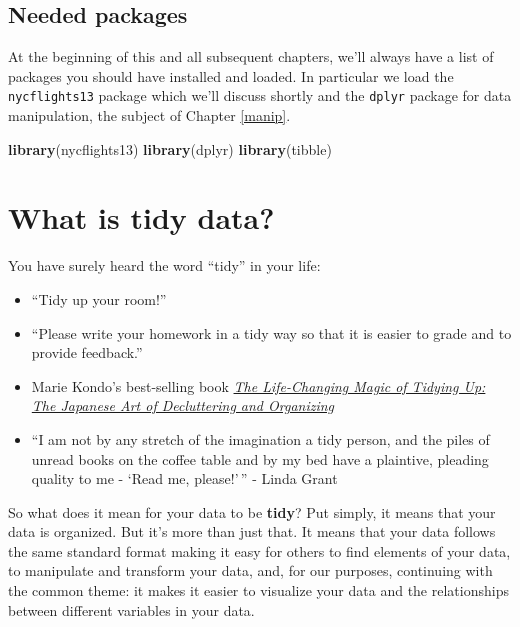 \documentclass[]{tufte-book}
\newenvironment{Shaded}{\begin{snugshade}}{\end{snugshade}}
\newcommand{\KeywordTok}[1]{\textcolor[rgb]{0.13,0.29,0.53}{\textbf{{#1}}}}
\newcommand{\NormalTok}[1]{{#1}}
\providecommand{\tightlist}{%
  \setlength{\itemsep}{0pt}\setlength{\parskip}{0pt}}
\begin{document}
\subsection*{Needed packages}\label{needed-packages}

At the beginning of this and all subsequent chapters, we'll always have
a list of packages you should have installed and loaded. In particular
we load the \texttt{nycflights13} package which we'll discuss shortly
and the \texttt{dplyr} package for data manipulation, the subject of
Chapter \ref{manip}.

\begin{Shaded}
\begin{Highlighting}[]
\KeywordTok{library}\NormalTok{(nycflights13)}
\KeywordTok{library}\NormalTok{(dplyr)}
\KeywordTok{library}\NormalTok{(tibble)}
\end{Highlighting}
\end{Shaded}

\section{What is tidy data?}\label{what-is-tidy-data}

You have surely heard the word ``tidy'' in your life:

\begin{itemize}
\tightlist
\item
  ``Tidy up your room!''
\item
  ``Please write your homework in a tidy way so that it is easier to
  grade and to provide feedback.''
\item
  Marie Kondo's best-selling book
  \href{https://www.amazon.com/Life-Changing-Magic-Tidying-Decluttering-Organizing/dp/1607747308/ref=sr_1_1?ie=UTF8\&qid=1469400636\&sr=8-1\&keywords=tidying+up}{\emph{The
  Life-Changing Magic of Tidying Up: The Japanese Art of Decluttering
  and Organizing}}
\item
  ``I am not by any stretch of the imagination a tidy person, and the
  piles of unread books on the coffee table and by my bed have a
  plaintive, pleading quality to me - `Read me, please!'\,'' - Linda
  Grant
\end{itemize}

So what does it mean for your data to be \textbf{tidy}? Put simply, it
means that your data is organized. But it's more than just that. It
means that your data follows the same standard format making it easy for
others to find elements of your data, to manipulate and transform your
data, and, for our purposes, continuing with the common theme: it makes
it easier to visualize your data and the relationships between different
variables in your data.
\end{document}
